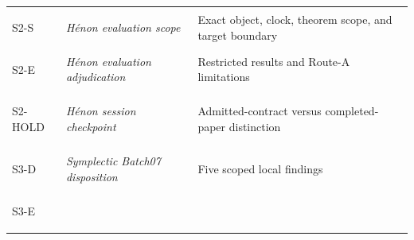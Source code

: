 \begin{longtable}[]{@{}lll@{}}
\begin{minipage}[t]{0.30\columnwidth}\raggedright
\hypertarget{record:S2-S}{S2-S}\strut
\end{minipage} & \begin{minipage}[t]{0.30\columnwidth}\raggedright
\textit{Hénon evaluation scope}\strut
\end{minipage} & \begin{minipage}[t]{0.30\columnwidth}\raggedright
Exact object, clock, theorem scope, and target boundary\strut
\end{minipage}\tabularnewline
\begin{minipage}[t]{0.30\columnwidth}\raggedright
\hypertarget{record:S2-E}{S2-E}\strut
\end{minipage} & \begin{minipage}[t]{0.30\columnwidth}\raggedright
\textit{Hénon evaluation adjudication}\strut
\end{minipage} & \begin{minipage}[t]{0.30\columnwidth}\raggedright
Restricted results and Route-A limitations\strut
\end{minipage}\tabularnewline
\begin{minipage}[t]{0.30\columnwidth}\raggedright
\hypertarget{record:S2-HOLD}{S2-HOLD}\strut
\end{minipage} & \begin{minipage}[t]{0.30\columnwidth}\raggedright
\textit{Hénon session checkpoint}\strut
\end{minipage} & \begin{minipage}[t]{0.30\columnwidth}\raggedright
Admitted-contract versus completed-paper distinction\strut
\end{minipage}\tabularnewline
\begin{minipage}[t]{0.30\columnwidth}\raggedright
\hypertarget{record:S3-D}{S3-D}\strut
\end{minipage} & \begin{minipage}[t]{0.30\columnwidth}\raggedright
\textit{Symplectic Batch07 disposition}\strut
\end{minipage} & \begin{minipage}[t]{0.30\columnwidth}\raggedright
Five scoped local findings\strut
\end{minipage}\tabularnewline
\begin{minipage}[t]{0.30\columnwidth}\raggedright
\hypertarget{record:S3-E}{S3-E}\strut
\end{minipage} & \begin{minipage}[t]{0.30\columnwidth}\raggedright

\end{minipage}
\end{longtable}

